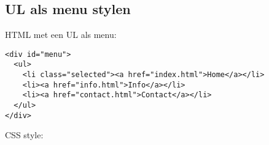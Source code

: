 \documentclass[8pt,pagesize,footinclude=false,headinclude=false]{scrartcl}
\begin{document}
\begin{multicols*}{4}
\subsection*{UL als menu stylen}
HTML met een UL als menu:
\begin{lstlisting}
<div id="menu"> 
  <ul>
	<li class="selected"><a href="index.html">Home</a></li>
    <li><a href="info.html">Info</a></li>
    <li><a href="contact.html">Contact</a></li>
  </ul>
</div>
\end{lstlisting}
CSS style:


\end{multicols*}
\end{document}

